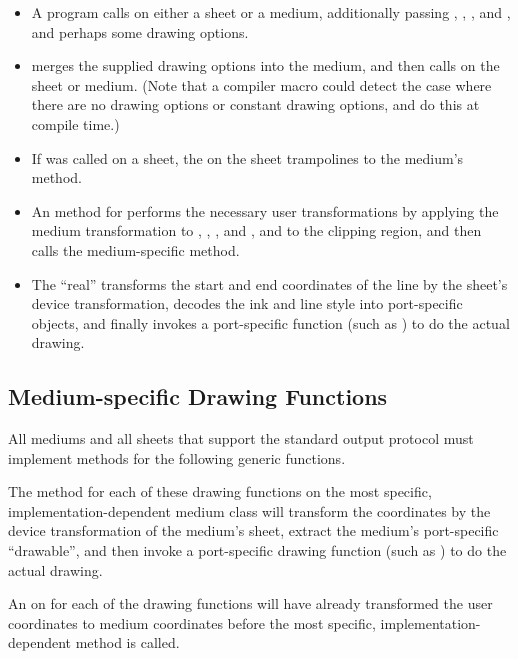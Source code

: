 \begin{itemize}
\item A program calls  on either a sheet or a medium, additionally passing ,
, , and , and perhaps some drawing options.

\item {} merges the supplied drawing options into the medium, and
then calls  on the sheet or medium.  (Note that a compiler
macro could detect the case where there are no drawing options or constant
drawing options, and do this at compile time.)

\item If  was called on a sheet, the  on
the sheet trampolines to the medium's  method.

\item An  method for  performs the necessary
user transformations by applying the medium transformation to ,
, , and , and to the clipping region, and then calls the
medium-specific method.

\item The ``real''  transforms the start and end
coordinates of the line by the sheet's device transformation, decodes the ink
and line style into port-specific objects, and finally invokes a port-specific
function (such as ) to do the actual drawing.
\end{itemize}


\subsection {Medium-specific Drawing Functions}

All mediums and all sheets that support the standard output protocol must
implement methods for the following generic functions.

The method for each of these drawing functions on the most specific,
implementation-dependent medium class will transform the coordinates by the
device transformation of the medium's sheet, extract the medium's port-specific
``drawable'', and then invoke a port-specific drawing function (such as
) to do the actual drawing.

An  on  for each of the drawing functions will have
already transformed the user coordinates to medium coordinates before the most
specific, implementation-dependent method is called.

